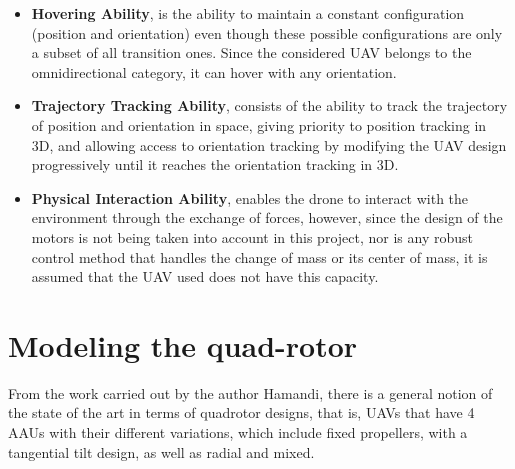 \documentclass[a4paper, 12pt, oneside]{book}
\begin{document}
\begin{itemize}
    \item \textbf{Hovering Ability}, is the ability to maintain a constant configuration (position and orientation) even though these possible configurations are only a subset of all transition ones. Since the considered UAV belongs to the omnidirectional category, it can hover with any orientation.
    \item \textbf{Trajectory Tracking Ability}, consists of the ability to track the trajectory of position and orientation in space, giving priority to position tracking in 3D, and allowing access to orientation tracking by modifying the UAV design progressively until it reaches the orientation tracking in 3D.
    \item \textbf{Physical Interaction Ability}, enables the drone to interact with the environment through the exchange of forces, however, since the design of the motors is not being taken into account in this project, nor is any robust control method that handles the change of mass or its center of mass, it is assumed that the UAV used does not have this capacity.
\end{itemize}

\section{Modeling the quad-rotor}\label{model}
From the work carried out by the author Hamandi, there is a general notion of the state of the art in terms of quadrotor designs, that is, UAVs that have 4 AAUs with their different variations, which include fixed propellers, with a tangential tilt design, as well as radial and mixed.
\end{document}
